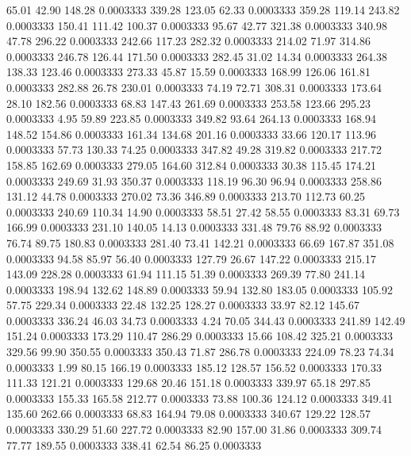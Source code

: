   65.01   42.90  148.28   0.0003333
 339.28  123.05   62.33   0.0003333
 359.28  119.14  243.82   0.0003333
 150.41  111.42  100.37   0.0003333
  95.67   42.77  321.38   0.0003333
 340.98   47.78  296.22   0.0003333
 242.66  117.23  282.32   0.0003333
 214.02   71.97  314.86   0.0003333
 246.78  126.44  171.50   0.0003333
 282.45   31.02   14.34   0.0003333
 264.38  138.33  123.46   0.0003333
 273.33   45.87   15.59   0.0003333
 168.99  126.06  161.81   0.0003333
 282.88   26.78  230.01   0.0003333
  74.19   72.71  308.31   0.0003333
 173.64   28.10  182.56   0.0003333
  68.83  147.43  261.69   0.0003333
 253.58  123.66  295.23   0.0003333
   4.95   59.89  223.85   0.0003333
 349.82   93.64  264.13   0.0003333
 168.94  148.52  154.86   0.0003333
 161.34  134.68  201.16   0.0003333
  33.66  120.17  113.96   0.0003333
  57.73  130.33   74.25   0.0003333
 347.82   49.28  319.82   0.0003333
 217.72  158.85  162.69   0.0003333
 279.05  164.60  312.84   0.0003333
  30.38  115.45  174.21   0.0003333
 249.69   31.93  350.37   0.0003333
 118.19   96.30   96.94   0.0003333
 258.86  131.12   44.78   0.0003333
 270.02   73.36  346.89   0.0003333
 213.70  112.73   60.25   0.0003333
 240.69  110.34   14.90   0.0003333
  58.51   27.42   58.55   0.0003333
  83.31   69.73  166.99   0.0003333
 231.10  140.05   14.13   0.0003333
 331.48   79.76   88.92   0.0003333
  76.74   89.75  180.83   0.0003333
 281.40   73.41  142.21   0.0003333
  66.69  167.87  351.08   0.0003333
  94.58   85.97   56.40   0.0003333
 127.79   26.67  147.22   0.0003333
 215.17  143.09  228.28   0.0003333
  61.94  111.15   51.39   0.0003333
 269.39   77.80  241.14   0.0003333
 198.94  132.62  148.89   0.0003333
  59.94  132.80  183.05   0.0003333
 105.92   57.75  229.34   0.0003333
  22.48  132.25  128.27   0.0003333
  33.97   82.12  145.67   0.0003333
 336.24   46.03   34.73   0.0003333
   4.24   70.05  344.43   0.0003333
 241.89  142.49  151.24   0.0003333
 173.29  110.47  286.29   0.0003333
  15.66  108.42  325.21   0.0003333
 329.56   99.90  350.55   0.0003333
 350.43   71.87  286.78   0.0003333
 224.09   78.23   74.34   0.0003333
   1.99   80.15  166.19   0.0003333
 185.12  128.57  156.52   0.0003333
 170.33  111.33  121.21   0.0003333
 129.68   20.46  151.18   0.0003333
 339.97   65.18  297.85   0.0003333
 155.33  165.58  212.77   0.0003333
  73.88  100.36  124.12   0.0003333
 349.41  135.60  262.66   0.0003333
  68.83  164.94   79.08   0.0003333
 340.67  129.22  128.57   0.0003333
 330.29   51.60  227.72   0.0003333
  82.90  157.00   31.86   0.0003333
 309.74   77.77  189.55   0.0003333
 338.41   62.54   86.25   0.0003333
